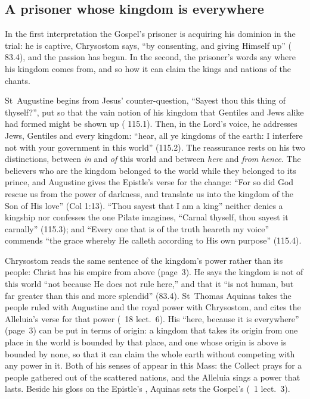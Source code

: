 \subsection{A prisoner whose kingdom is everywhere}

In the first interpretation the Gospel's prisoner is acquiring his dominion
in the trial: he is captive, Chrysostom says, ``by consenting, and
giving Himself up'' ( 83.4), and the passion has begun.
In the second, the prisoner's words say where his kingdom comes from, and so
how it can claim the kings and nations of the chants.

St~Augustine begins from Jesus' counter-question, ``Sayest thou this thing of
thyself?'', put so that the vain notion of his kingdom that Gentiles and Jews
alike had formed might be shown up (
115.1). Then, in the Lord's voice, he addresses Jews, Gentiles and every kingdom:
``hear, all ye kingdoms
of the earth: I interfere not with your government in this world'' (115.2).
The reassurance rests on his two distinctions, between
\emph{in} and \emph{of} this world and between \emph{here} and \emph{from
hence}. The believers who are the kingdom belonged to the world while they
belonged to its prince, and Augustine gives the Epistle's
verse for the change: ``For so did God rescue us from the power of darkness,
and translate us into the kingdom of the Son of His love'' (Col 1:13). ``Thou
sayest that I am a king'' neither denies a kingship nor confesses the one
Pilate imagines, ``Carnal thyself, thou sayest it carnally'' (115.3); and
``Every one that is of the truth heareth my voice'' commends ``the grace
whereby He calleth according to His own purpose'' (115.4).

Chrysostom reads the same sentence of the kingdom's power rather than its
people: Christ has his empire from above (page~3). He says the kingdom is
not of this world ``not because He does not rule here,'' and that it ``is not human, but far greater
than this and more splendid'' (83.4). St~Thomas Aquinas takes the people
ruled with Augustine and the royal power with Chrysostom, and cites the Alleluia's verse for that power (\
18 lect.~6). His ``here, because it is everywhere'' (page~3) can be put in
terms of origin: a kingdom that
takes its origin from one place in the world is bounded by that place, and one
whose origin is above is bounded by none, so that it can claim the whole earth
without competing with any power in it. Both of his senses of \latin{regnum}
appear in this Mass: the Collect prays for a people gathered out of the
scattered nations, and the Alleluia sings a power that lasts.
Beside his gloss on the Epistle's , Aquinas sets the
Gospel's \latin{regnum meum non est de hoc mundo} (\work{Super Col.}\ 1
lect.~3).

